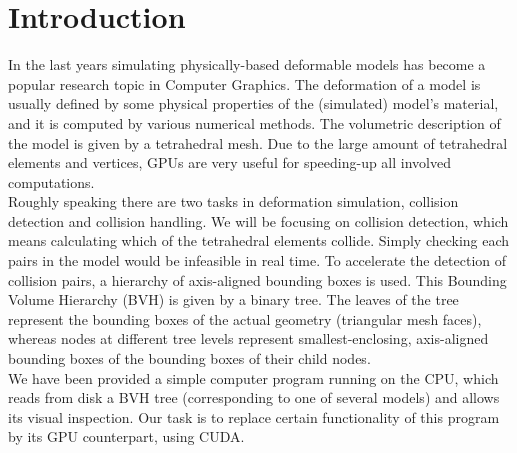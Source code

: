 \section{Introduction}
In the last years simulating physically-based deformable models has become a popular research topic in Computer Graphics. The deformation of a model is usually defined by some physical properties of the (simulated) model’s material, and it is computed by various numerical methods. The volumetric description of the model is given by a tetrahedral mesh. Due to the large amount of tetrahedral elements and vertices, GPUs are very useful for speeding-up all involved computations.\\
Roughly speaking there are two tasks in deformation simulation, collision detection and collision handling. We will be focusing on collision detection, which means calculating which of the tetrahedral elements collide. Simply checking each pairs in the model would be infeasible in real time. To accelerate the detection of collision pairs, a hierarchy of axis-aligned bounding boxes is used. This Bounding Volume Hierarchy (BVH) is given by a binary tree. The leaves of the tree represent the bounding boxes of the actual geometry (triangular mesh faces), whereas nodes at different tree levels represent smallest-enclosing, axis-aligned bounding boxes of the bounding boxes of their child nodes.\\
We have been provided a simple computer program running on the CPU, which reads from disk a BVH tree (corresponding to one of several models) and allows
its visual inspection. Our task is to replace certain functionality of this program by its GPU counterpart, using CUDA.
